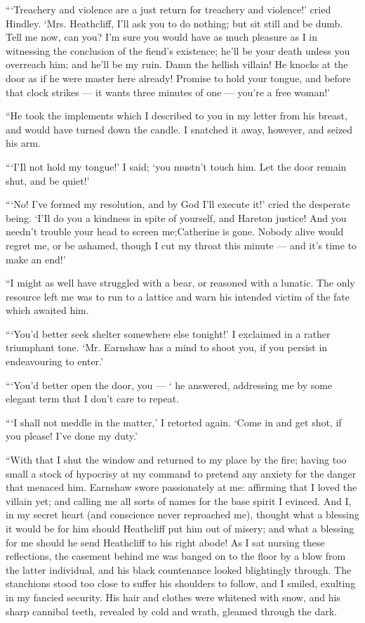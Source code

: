 \par “‘Treachery and violence are a just return for treachery and violence!’ cried Hindley. ‘Mrs. Heathcliff, I'll ask you to do nothing; but sit still and be dumb. Tell me now, can you? I'm sure you would have as much pleasure as I in witnessing the conclusion of the fiend's existence; he'll be your death unless you overreach him; and he'll be my ruin. Damn the hellish villain! He knocks at the door as if he were master here already! Promise to hold your tongue, and before that clock strikes — it wants three minutes of one — you're a free woman!’
\par “He took the implements which I described to you in my letter from his breast, and would have turned down the candle. I snatched it away, however, and seized his arm.
\par “‘I'Il not hold my tongue!’ I said; ‘you mustn't touch him. Let the door remain shut, and be quiet!’
\par “‘No! I've formed my resolution, and by God I'll execute it!’ cried the desperate being. ‘I'Il do you a kindness in spite of yourself, and Hareton justice! And you needn't trouble your head to screen me;Catherine is gone. Nobody alive would regret me, or be ashamed, though I cut my throat this minute — and it's time to make an end!’
\par “I might as well have struggled with a bear, or reasoned with a lunatic. The only resource left me was to run to a lattice and warn his intended victim of the fate which awaited him.
\par “‘You'd better seek shelter somewhere else tonight!’ I exclaimed in a rather triumphant tone. ‘Mr. Earnshaw has a mind to shoot you, if you persist in endeavouring to enter.’
\par “‘You'd better open the door, you — ‘ he answered, addressing me by some elegant term that I don't care to repeat.
\par “‘I shall not meddle in the matter,’ I retorted again. ‘Come in and get shot, if you please! I've done my duty.’
\par “With that I shut the window and returned to my place by the fire; having too small a stock of hypocrisy at my command to pretend any anxiety for the danger that menaced him. Earnshaw swore passionately at me: affirming that I loved the villain yet; and calling me all sorts of names for the base spirit I evinced. And I, in my secret heart (and conscience never reproached me), thought what a blessing it would be for him should Heathcliff put him out of misery; and what a blessing for me should he send Heathcliff to his right abode! As I sat nursing these reflections, the casement behind me was banged on to the floor by a blow from the latter individual, and his black countenance looked blightingly through. The stanchions stood too close to suffer his shoulders to follow, and I smiled, exulting in my fancied security. His hair and clothes were whitened with snow, and his sharp cannibal teeth, revealed by cold and wrath, gleamed through the dark.
